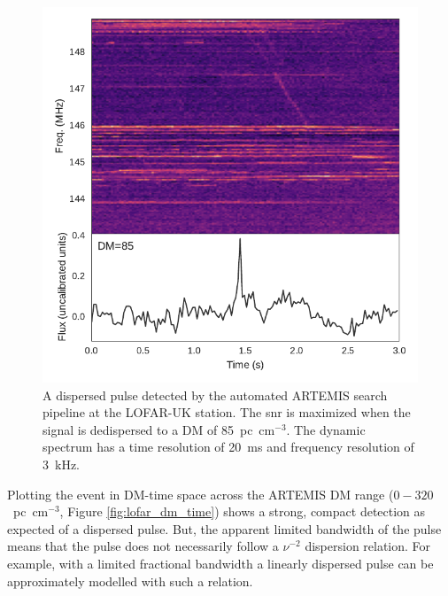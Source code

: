 \documentclass[a4paper,fleqn,usenatbib]{mnras}
\begin{document}
\begin{figure}
    \includegraphics[width=1.0\linewidth]{figures/LOFAR_dynamic.pdf}
    \caption{A dispersed pulse detected by the automated ARTEMIS search pipeline
    at the LOFAR-UK station. The \gls{snr} is maximized when the signal is
    dedispersed to a DM of 85~pc~cm$^{-3}$. The dynamic spectrum has a time
    resolution of 20~ms and frequency resolution of 3~kHz.
    }
    \label{fig:lofar_dynamic}
\end{figure}

Plotting the event in DM-time space across the ARTEMIS DM range
($0-320$~pc~cm$^{-3}$, Figure \ref{fig:lofar_dm_time}) shows a strong, compact
detection as expected of a dispersed pulse. But, the apparent limited bandwidth
of the pulse means that the pulse does not necessarily follow a $\nu^{-2}$
dispersion relation. For example, with a limited fractional bandwidth a linearly
dispersed pulse can be approximately modelled with such a relation.
\end{document}
